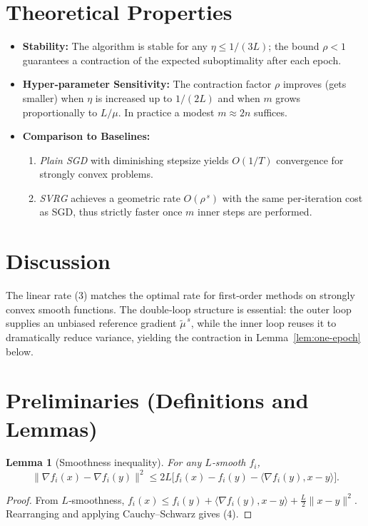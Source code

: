 \documentclass{article}
\newtheorem{lemma}{Lemma}
\begin{document}
\section*{Theoretical Properties}
\begin{itemize}[leftmargin=*]
\item \textbf{Stability:} The algorithm is stable for any $\eta\le 1/(3L)$; the bound $\rho<1$ guarantees a contraction of the expected suboptimality after each epoch.
\item \textbf{Hyper‑parameter Sensitivity:} The contraction factor $\rho$ improves (gets smaller) when $\eta$ is increased up to $1/(2L)$ and when $m$ grows proportionally to $L/\mu$. In practice a modest $m\approx 2n$ suffices.
\item \textbf{Comparison to Baselines:}
    \begin{enumerate}
        \item \emph{Plain SGD} with diminishing stepsize yields $O(1/T)$ convergence for strongly convex problems.
        \item \emph{SVRG} achieves a geometric rate $O(\rho^{\,s})$ with the same per‑iteration cost as SGD, thus strictly faster once $m$ inner steps are performed.
    \end{enumerate}
\end{itemize}

\section*{Discussion}
The linear rate (3) matches the optimal rate for first‑order methods on strongly convex smooth functions. The double‑loop structure is essential: the outer loop supplies an unbiased reference gradient $\tilde{\mu}^{\,s}$, while the inner loop reuses it to dramatically reduce variance, yielding the contraction in Lemma~\ref{lem:one-epoch} below.

\section*{Preliminaries (Definitions and Lemmas)}
\begin{lemma}[Smoothness inequality]\label{lem:smooth}
For any $L$‑smooth $f_i$,
\[
\|\nabla f_i(x)-\nabla f_i(y)\|^2\le 2L\bigl[f_i(x)-f_i(y)-\langle\nabla f_i(y),x-y\rangle\bigr].
\tag{4}
\]
\end{lemma}
\begin{proof}
From $L$‑smoothness,
$f_i(x)\le f_i(y)+\langle\nabla f_i(y),x-y\rangle+\frac{L}{2}\|x-y\|^2$.
Rearranging and applying Cauchy–Schwarz gives (4). \qedhere
\end{proof}
\end{document}
